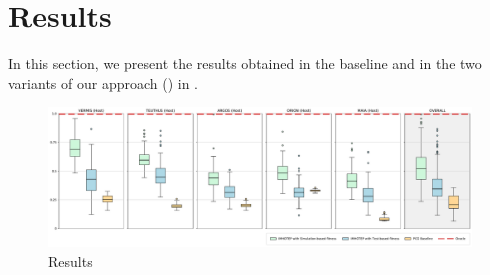 \section{Results}
\label{sec:Results}
In this section, we present the results obtained in the baseline and in the two variants of our approach (\ApproachName{}) in \CaseStudy{}.

\begin{figure}
    \centering
    \includegraphics[width=\textwidth]{Figures/Imhotep_with_legend_and_oracle_average-v4.pdf}
    \caption{Results}
    \label{fig:results}
\end{figure}



